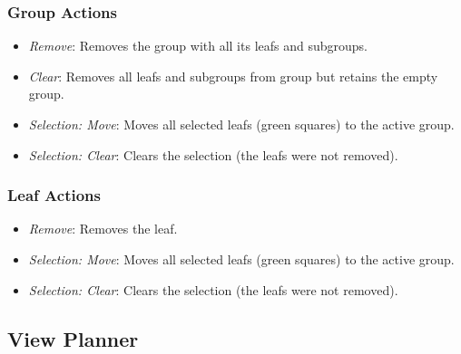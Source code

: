 \subsubsection{Group Actions}
\label{sec:groupActions}

\begin{itemize}
	\item \textit{Remove}: Removes the group with all its leafs and subgroups.
	\item \textit{Clear}: Removes all leafs and subgroups from group but retains the empty group. 
	\item \textit{Selection: Move}: Moves all selected leafs (green squares) to the active group.
	\item \textit{Selection: Clear}: Clears the selection (the leafs were not removed).
\end{itemize}
	
\subsubsection{Leaf Actions}
\label{sec:leafActions}

\begin{itemize}
	\item \textit{Remove}: Removes the leaf.
	\item \textit{Selection: Move}: Moves all selected leafs (green squares) to the active group.
	\item \textit{Selection: Clear}: Clears the selection (the leafs were not removed).
\end{itemize}

\newpage
\subsection{View Planner}
\label{sec:viewplanner}

